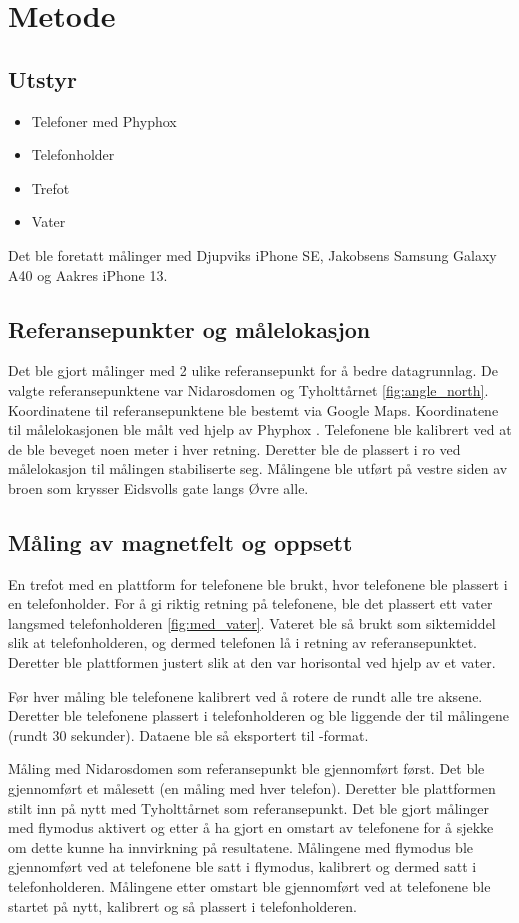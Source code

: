 \section{Metode}
\subsection{Utstyr}
\begin{itemize}
    \item Telefoner med Phyphox
    \item Telefonholder
    \item Trefot
    \item Vater
\end{itemize}
Det ble foretatt målinger med Djupviks iPhone SE, Jakobsens Samsung Galaxy A40 og Aakres iPhone 13. 

\subsection{Referansepunkter og målelokasjon}
Det ble gjort målinger med 2 ulike referansepunkt for å bedre datagrunnlag. De valgte referansepunktene var Nidarosdomen og Tyholttårnet \ref{fig:angle_north}. Koordinatene til referansepunktene ble bestemt via Google Maps. Koordinatene til målelokasjonen ble målt ved hjelp av Phyphox \cite{phyphox}. Telefonene ble kalibrert ved at de ble beveget noen meter i hver retning. Deretter ble de plassert i ro ved målelokasjon til målingen stabiliserte seg. Målingene ble utført på vestre siden av broen som krysser Eidsvolls gate langs Øvre alle. 


\subsection{Måling av magnetfelt og oppsett}
En trefot med en plattform for telefonene ble brukt, hvor telefonene ble plassert i en telefonholder. For å gi riktig retning på telefonene, ble det plassert ett vater langsmed telefonholderen \ref{fig:med_vater}. Vateret ble så brukt som siktemiddel slik at telefonholderen, og dermed telefonen lå i retning av referansepunktet. Deretter ble plattformen justert slik at den var horisontal ved hjelp av et vater.

Før hver måling ble telefonene kalibrert ved å rotere de rundt alle tre aksene. Deretter ble telefonene plassert i telefonholderen og ble liggende der til målingene (rundt $30$ sekunder). Dataene ble så eksportert til -format. 

Måling med Nidarosdomen som referansepunkt ble gjennomført først. Det ble gjennomført et målesett (en måling med hver telefon). Deretter ble plattformen stilt inn på nytt med Tyholttårnet som referansepunkt. Det ble gjort målinger med flymodus aktivert og etter å ha gjort en omstart av telefonene for å sjekke om dette kunne ha innvirkning på resultatene. Målingene med flymodus ble gjennomført ved at telefonene ble satt i flymodus, kalibrert og dermed satt i telefonholderen. Målingene etter omstart ble gjennomført ved at telefonene ble startet på nytt, kalibrert og så plassert i telefonholderen.


